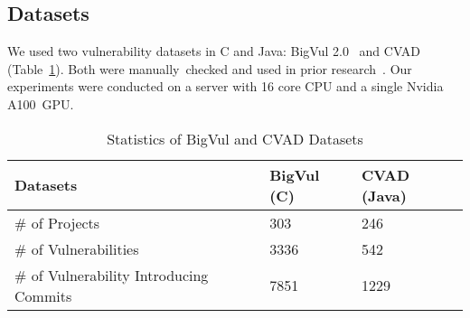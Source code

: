 \subsection{\textbf{Datasets}}\label{dataset}

We used two vulnerability datasets in C and Java: BigVul
2.0~\cite{bigvul-msr20} and CVAD~\cite{deepCVA-ase21}
(Table~\ref{dataset:tab}).
Both were manually~checked and used in prior
research~\cite{bigvul-msr20,li2021vulnerability,deepCVA-ase21}. Our
experiments were conducted on a server with 16 core CPU and a single
Nvidia A100~GPU.




\begin{table}[t]
	\caption{Statistics of BigVul and CVAD Datasets}
        \tabcolsep 2.5pt
        \vspace{-10pt}
	\begin{center}
\small
		\renewcommand{\arraystretch}{1}
		\begin{tabular}{l|p{1.5cm}<{\centering}|p{2cm}<{\centering}}
		\hline	
        	Datasets	& BigVul (C) & CVAD (Java)\\\hline
		\# of Projects  & 303 & 246 \\\hline
	    \# of Vulnerabilities & 3336 & 542\\\hline
     	\# of Vulnerability Introducing Commits & 7851 & 1229\\\hline

		\end{tabular}
		\label{dataset:tab}
	\end{center}
\end{table}





